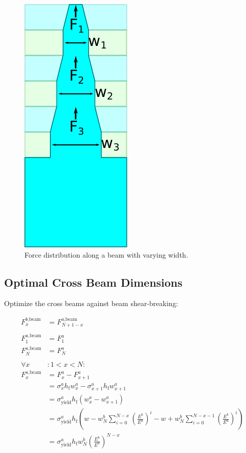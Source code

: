 \begin{figure}
	\centering
	\includegraphics[height=.5\columnwidth]{sources/method/stress_distribution.pdf}
	\caption{Force distribution along a beam with varying width.}
	\label{force_distribution}
\end{figure}

\fi



\subsection{Optimal Cross Beam Dimensions}

Optimize the cross beams against beam shear-breaking:

\begin{align*}
	F^{b \text{,beam}}_x &=F^{a \text{,beam}}_{N+1-x} \\
	\\
	F^{a \text{,beam}}_1 &= F^a_1 \\
	F^{a \text{,beam}}_N &= F^a_N \\
	\\
	\forall x &: 1 < x < N  : \\
	F^{a \text{,beam}}_x &= F^a_x - F^a_{x+1} \\
	&= \sigma^a_x h_\text{f} w^a_x - \sigma^a_{x+1} h_\text{f} w^a_{x+1} \\
	&= \sigma^a_\text{yield} h_\text{f} \left( w^a_x - w^a_{x+1} \right) \\
	&= \sigma^a_\text{yield} h_\text{f} \left( w - w^b_N \sum\limits_{i=0}^{N-x} \left(\frac{E^b}{E^a}\right)^i - w + w^b_N \sum\limits_{i=0}^{N-x-1} \left(\frac{E^b}{E^a}\right)^i \right) \\
	&= \sigma^a_\text{yield} h_\text{f} w^b_N \left(\frac{E^b}{E^a}\right)^{N-x} \\
\end{align*}

